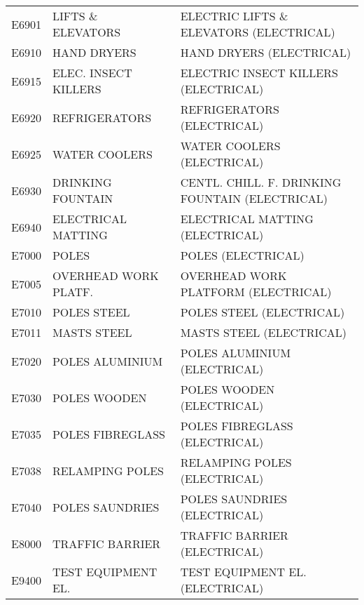 \begin{longtable}[l]{l%
                  l|%
                  l|}
\rowcolor{thetableheadbgcolor!0.25!white} E6901       & LIFTS \& ELEVATORS   & ELECTRIC LIFTS \& ELEVATORS (ELECTRICAL)   \\
\rowcolor{thetableheadbgcolor!0.25!white} E6910       & HAND DRYERS   & HAND DRYERS (ELECTRICAL)   \\
\rowcolor{thetableheadbgcolor!0.25!white} E6915       & ELEC. INSECT KILLERS   & ELECTRIC INSECT KILLERS (ELECTRICAL)   \\
\rowcolor{thetableheadbgcolor!0.25!white} E6920       & REFRIGERATORS   & REFRIGERATORS (ELECTRICAL)   \\
\rowcolor{thetableheadbgcolor!0.25!white} E6925       & WATER COOLERS   & WATER COOLERS (ELECTRICAL)   \\
\rowcolor{thetableheadbgcolor!0.25!white} E6930       & DRINKING FOUNTAIN   & CENTL. CHILL. F. DRINKING FOUNTAIN (ELECTRICAL)   \\
\rowcolor{thetableheadbgcolor!0.25!white} E6940       & ELECTRICAL MATTING   & ELECTRICAL MATTING (ELECTRICAL)   \\
\rowcolor{thetableheadbgcolor!0.25!white} E7000       & POLES   & POLES (ELECTRICAL)   \\
\rowcolor{thetableheadbgcolor!0.25!white} E7005       & OVERHEAD WORK PLATF.   & OVERHEAD WORK PLATFORM (ELECTRICAL)   \\
\rowcolor{thetableheadbgcolor!0.25!white} E7010       & POLES STEEL   & POLES STEEL (ELECTRICAL)   \\
\rowcolor{thetableheadbgcolor!0.25!white} E7011       & MASTS STEEL   & MASTS STEEL (ELECTRICAL)   \\
\rowcolor{thetableheadbgcolor!0.25!white} E7020       & POLES ALUMINIUM   & POLES ALUMINIUM (ELECTRICAL)   \\
\rowcolor{thetableheadbgcolor!0.25!white} E7030       & POLES WOODEN   & POLES WOODEN (ELECTRICAL)   \\
\rowcolor{thetableheadbgcolor!0.25!white} E7035       & POLES FIBREGLASS   & POLES FIBREGLASS (ELECTRICAL)   \\
\rowcolor{thetableheadbgcolor!0.25!white} E7038       & RELAMPING POLES   & RELAMPING POLES (ELECTRICAL)   \\
\rowcolor{thetableheadbgcolor!0.25!white} E7040       & POLES SAUNDRIES   & POLES SAUNDRIES (ELECTRICAL)   \\
\rowcolor{thetableheadbgcolor!0.25!white} E8000       & TRAFFIC BARRIER   & TRAFFIC BARRIER (ELECTRICAL)   \\
\rowcolor{thetableheadbgcolor!0.25!white} E9400       & TEST EQUIPMENT EL.   & TEST EQUIPMENT EL. (ELECTRICAL)   \\

\end{longtable}
